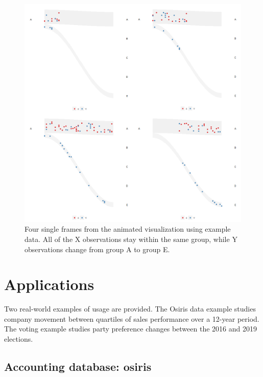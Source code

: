 \begin{figure}

{\centering \includegraphics[width=1\linewidth]{figures/animation-example} 

}

\caption{Four single frames from the animated visualization using example data. All of the X observations stay within the same group, while Y observations change from group A to group E.}\label{fig:catchange-figure}
\end{figure}

\section{Applications}\label{applications}

Two real-world examples of usage are provided. The Osiris data \citep{bvd} example studies company movement between quartiles of sales performance over a 12-year period. The voting example studies party preference changes between the 2016 and 2019 elections.

\subsection{Accounting database: osiris}\label{accounting-database-osiris}

